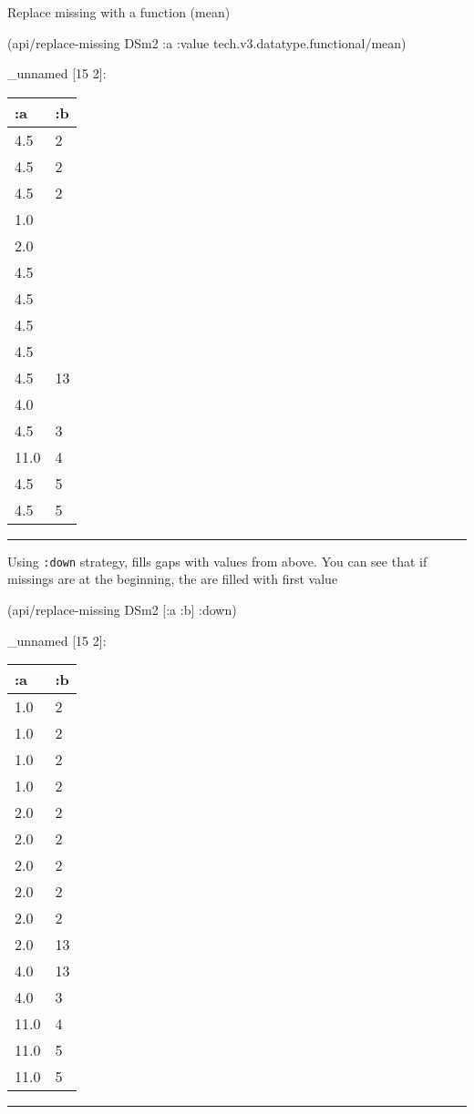 \documentclass[]{article}
\newenvironment{Shaded}{\begin{snugshade}}{\end{snugshade}}
\newcommand{\AttributeTok}[1]{\textcolor[rgb]{0.77,0.63,0.00}{#1}}
\newcommand{\NormalTok}[1]{#1}
\begin{document}
Replace missing with a function (mean)

\begin{Shaded}
\begin{Highlighting}[]
\NormalTok{(api/replace-missing DSm2 }\AttributeTok{:a} \AttributeTok{:value}\NormalTok{ tech.v3.datatype.functional/mean)}
\end{Highlighting}
\end{Shaded}

\_unnamed {[}15 2{]}:

\begin{longtable}[]{@{}ll@{}}
\toprule
:a & :b\tabularnewline
\midrule
\endhead
4.5 & 2\tabularnewline
4.5 & 2\tabularnewline
4.5 & 2\tabularnewline
1.0 &\tabularnewline
2.0 &\tabularnewline
4.5 &\tabularnewline
4.5 &\tabularnewline
4.5 &\tabularnewline
4.5 &\tabularnewline
4.5 & 13\tabularnewline
4.0 &\tabularnewline
4.5 & 3\tabularnewline
11.0 & 4\tabularnewline
4.5 & 5\tabularnewline
4.5 & 5\tabularnewline
\bottomrule
\end{longtable}

\begin{center}\rule{0.5\linewidth}{0.5pt}\end{center}

Using \texttt{:down} strategy, fills gaps with values from above. You
can see that if missings are at the beginning, the are filled with first
value

\begin{Shaded}
\begin{Highlighting}[]
\NormalTok{(api/replace-missing DSm2 [}\AttributeTok{:a} \AttributeTok{:b}\NormalTok{] }\AttributeTok{:down}\NormalTok{)}
\end{Highlighting}
\end{Shaded}

\_unnamed {[}15 2{]}:

\begin{longtable}[]{@{}ll@{}}
\toprule
:a & :b\tabularnewline
\midrule
\endhead
1.0 & 2\tabularnewline
1.0 & 2\tabularnewline
1.0 & 2\tabularnewline
1.0 & 2\tabularnewline
2.0 & 2\tabularnewline
2.0 & 2\tabularnewline
2.0 & 2\tabularnewline
2.0 & 2\tabularnewline
2.0 & 2\tabularnewline
2.0 & 13\tabularnewline
4.0 & 13\tabularnewline
4.0 & 3\tabularnewline
11.0 & 4\tabularnewline
11.0 & 5\tabularnewline
11.0 & 5\tabularnewline
\bottomrule
\end{longtable}

\begin{center}\rule{0.5\linewidth}{0.5pt}\end{center}
\end{document}
